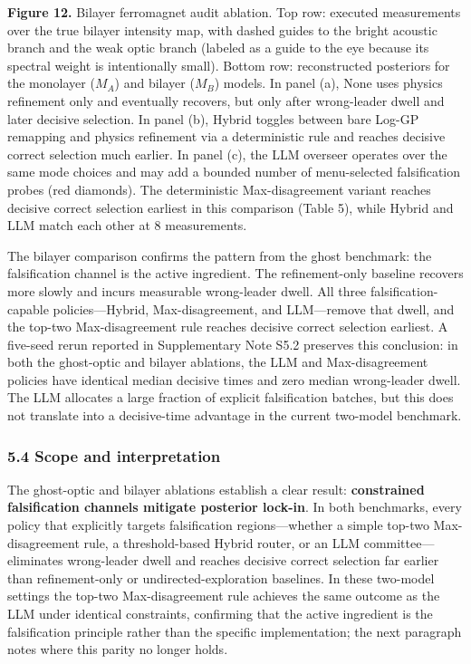 \documentclass[
]{article}
\begin{document}
\textbf{Figure 12.} Bilayer ferromagnet audit ablation. Top row:
executed measurements over the true bilayer intensity map, with dashed
guides to the bright acoustic branch and the weak optic branch (labeled
as a guide to the eye because its spectral weight is intentionally
small). Bottom row: reconstructed posteriors for the monolayer (\(M_A\))
and bilayer (\(M_B\)) models. In panel (a), None uses physics refinement
only and eventually recovers, but only after wrong-leader dwell and
later decisive selection. In panel (b), Hybrid toggles between bare
Log-GP remapping and physics refinement via a deterministic rule and
reaches decisive correct selection much earlier. In panel (c), the LLM
overseer operates over the same mode choices and may add a bounded
number of menu-selected falsification probes (red diamonds). The
deterministic Max-disagreement variant reaches decisive correct
selection earliest in this comparison (Table 5), while Hybrid and LLM
match each other at 8 measurements.

The bilayer comparison confirms the pattern from the ghost benchmark:
the falsification channel is the active ingredient. The refinement-only
baseline recovers more slowly and incurs measurable wrong-leader dwell.
All three falsification-capable policies---Hybrid, Max-disagreement, and
LLM---remove that dwell, and the top-two Max-disagreement rule reaches
decisive correct selection earliest. A five-seed rerun reported in
Supplementary Note S5.2 preserves this conclusion: in both the
ghost-optic and bilayer ablations, the LLM and Max-disagreement policies
have identical median decisive times and zero median wrong-leader dwell.
The LLM allocates a large fraction of explicit falsification batches,
but this does not translate into a decisive-time advantage in the
current two-model benchmark.

\hypertarget{scope-and-interpretation}{%
\subsubsection{5.4 Scope and
interpretation}\label{scope-and-interpretation}}

The ghost-optic and bilayer ablations establish a clear result:
\textbf{constrained falsification channels mitigate posterior lock-in}.
In both benchmarks, every policy that explicitly targets falsification
regions---whether a simple top-two Max-disagreement rule, a
threshold-based Hybrid router, or an LLM committee---eliminates
wrong-leader dwell and reaches decisive correct selection far earlier
than refinement-only or undirected-exploration baselines. In these
two-model settings the top-two Max-disagreement rule achieves the same
outcome as the LLM under identical constraints, confirming that the
active ingredient is the falsification principle rather than the
specific implementation; the next paragraph notes where this parity no
longer holds.
\end{document}
